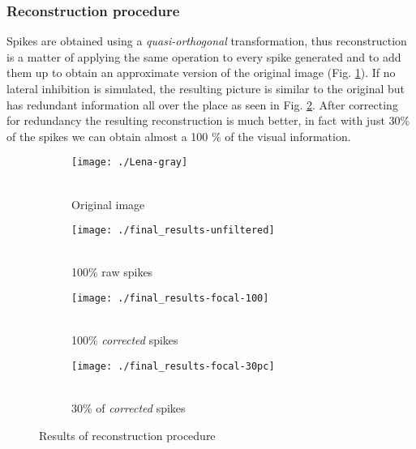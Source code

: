 \subsubsection{Reconstruction procedure}
Spikes are obtained using a \emph{quasi-orthogonal} transformation,
thus reconstruction is a matter of applying the same operation
to every spike generated and to add them up to obtain an approximate
version of the original image (Fig. \ref{pic-original-lena}). If no
lateral inhibition is simulated, the resulting picture is similar to
the original but has redundant information all over the place as seen
in Fig. \ref{pic-unfiltered-spikes}. After correcting for redundancy
the resulting reconstruction is much better, in fact with just 30\% 
of the spikes we can obtain almost a 100 \% of the visual information\cite{basab-model}.

\begin{figure}[hbt]
    \centering
    \begin{subfigure}[t]{0.15\textwidth}
        \centering
        \captionsetup{justification=centering,margin=0.1cm}
        \texttt{[image: ./Lena-gray]}
        \caption{\\Original image}
        \label{pic-original-lena}
    \end{subfigure}
    \begin{subfigure}[t]{0.15\textwidth}
        \centering
        \captionsetup{justification=centering,margin=0.1cm}
        \texttt{[image: ./final\_results-unfiltered]}
        \caption{\\100\% raw spikes}
        \label{pic-unfiltered-spikes}
    \end{subfigure}
    \begin{subfigure}[t]{0.15\textwidth}
        \centering
        \captionsetup{justification=centering,margin=0.1cm}
        \texttt{[image: ./final\_results-focal-100]}
        \caption{\\100\% \emph{corrected} spikes}
        \label{pic-100pc-spikes}
    \end{subfigure}
    \begin{subfigure}[t]{0.15\textwidth}
        \centering
        \captionsetup{justification=centering,margin=0.1cm}
        \texttt{[image: ./final\_results-focal-30pc]}
        \caption{\\30\% of \emph{corrected} spikes}
        \label{pic-30pc-spikes}
    \end{subfigure}
    \caption{Results of reconstruction procedure}
\end{figure}